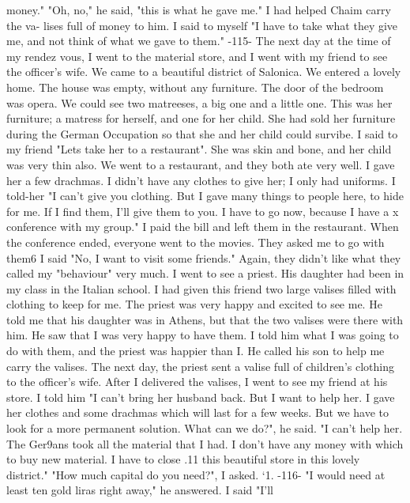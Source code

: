 money." 
"Oh, no," he said, "this is what he gave me." I had helped Chaim carry the va-
lises full of money to him. I said to myself "I have to take what they give me, and 
not think of what we gave to them." 
-115- 
The next day at the time of my rendez vous, I went to the material store, and I 
went with my friend to see the officer's wife. We came to a beautiful district of 
Salonica. We entered a lovely home. The house was empty, without any furniture. The 
door of the bedroom was opera. We could see two matreeses, a big one and a little one. 
This was her furniture; a matress for herself, and one for her child. She had sold 
her furniture during the German Occupation so that she and her child could survibe. 
I said to my friend "Lets take her to a restaurant". She was skin and bone, and 
her child was very thin also. We went to a restaurant, and they both ate very well. 
I gave her a few drachmas. I didn't have any clothes to give her; I only had uniforms. 
I told-her "I can't give you clothing. But I gave many things to people here, to hide 
for me. If I find them, I'll give them to you. I have to go now, because I have a 
x conference with my group." I paid the bill and left them in the restaurant. 
When the conference ended, everyone went to the movies. They asked me to go with 
them6 I said "No, I want to visit some friends." Again, they didn't like what they 
called my "behaviour" very much. 
I went to see a priest. His daughter had been in my class in the Italian school. 
I had given this friend two large valises filled with clothing to keep for me. The 
priest was very happy and excited to see me. He told me that his daughter was in 
Athens, but that the two valises were there with him. He saw that I was very happy to 
have them. I told him what I was going to do with them, and the priest was happier 
than I. He called his son to help me carry the valises. The next day, the priest sent 
a valise full of children's clothing to the officer's wife. 
After I delivered the valises, I went to see my friend at his store. I told him 
"I can't bring her husband back. But I want to help her. I gave her clothes and some 
drachmas which will last for a few weeks. But we have to look for a more permanent 
solution. 
What can we do?", he said. "I can't help her. The Ger9ans took all the material 
that I had. I don't have any money with which to buy new material. I have to close 
.11 
this beautiful store in this lovely district." 
"How much capital do you need?", I asked. 
`1. 
-116- 
"I would need at least ten gold liras right away," he answered. I said "I'll 
